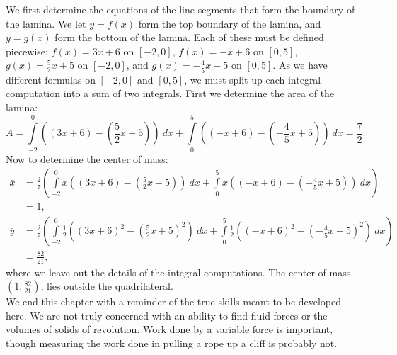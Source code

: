 {We first determine the equations of the line segments that form the boundary of the lamina.  We let $y=f(x)$ form the top boundary of the lamina, and $y=g(x)$ form the bottom of the lamina.  Each of these must be defined piecewise: $f(x)=3x+6$ on $[-2,0]$, $f(x)=-x+6$ on $[0,5]$, $g(x)=\frac52 x+5$ on $[-2,0]$, and $g(x)=-\frac45 x +5$ on $[0,5]$.  As we have different formulas on $[-2,0]$ and $[0,5]$, we must split up each integral computation into a sum of two integrals.
First we determine the area of the lamina:
$$
A = \int\limits_{-2}^0 \left((3x+6)-\left(\frac52 x +5\right)\right)\ dx + \int\limits_0^5 \left((-x+6)-\left( -\frac45 x +5 \right)\right)\ dx = \frac{7}{2}.
$$
Now to determine the center of mass:
\begin{align*}
\bar{x} &= \frac27 \left( \int\limits_{-2}^0 x\left( (3x+6)-\left(\frac52 x +5\right) \right)\ dx +  \int\limits_0^5 x\left( (-x+6)-\left(-\frac45 x +5\right) \right)\ dx\right)\\ &= 1,\\
\bar{y} &= \frac27 \left( \int\limits_{-2}^0 \frac12 \left( (3x+6)^2-\left(\frac52 x +5\right)^2 \right)\ dx +  \int\limits_0^5 \frac12 \left( (-x+6)^2-\left(-\frac45 x +5\right)^2 \right)\ dx\right) \\&= \frac{82}{21},
\end{align*}
where we leave out the details of the integral computations.  The center of mass, $\left(1,\frac{82}{21}\right)$, lies outside the quadrilateral.
}\\


















We end this chapter with a reminder of the true skills meant to be developed here. We are not truly concerned with an ability to find fluid forces or the volumes of solids of revolution. Work done by a variable force is important, though measuring the work done in pulling a rope up a cliff is probably not.

